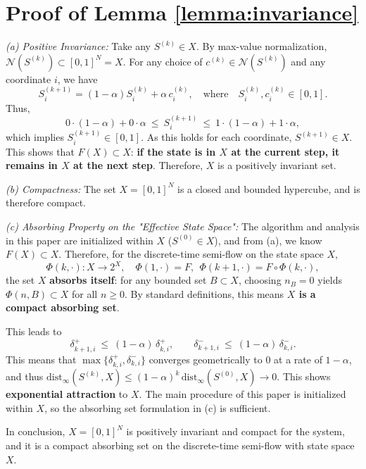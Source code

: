 \documentclass[journal]{IEEEtran}
\begin{document}
\appendices
\section{Proof of Lemma \ref{lemma:invariance}}
\label{app:proof_lemma_invariance}
\begin{IEEEproof}
\textit{(a) Positive Invariance:}
Take any $S^{(k)}\in X$. By max-value normalization, $\mathcal N(S^{(k)})\subset[0,1]^N=X$. For any choice of $c^{(k)}\in\mathcal N(S^{(k)})$ and any coordinate $i$, we have
\begin{equation}
S^{(k+1)}_i=(1-\alpha)S^{(k)}_i+\alpha\,c^{(k)}_i,
\quad\text{where}\quad S^{(k)}_i,c^{(k)}_i\in[0,1].
\end{equation}
Thus,
\begin{equation}
0\cdot(1-\alpha)+0\cdot\alpha\ \le\ S^{(k+1)}_i\ \le\ 1\cdot(1-\alpha)+1\cdot\alpha,
\end{equation}
which implies $S^{(k+1)}_i\in[0,1]$. As this holds for each coordinate, $S^{(k+1)}\in X$. This shows that $F(X)\subset X$: \textbf{if the state is in $X$ at the current step, it remains in $X$ at the next step}. Therefore, $X$ is a positively invariant set.

\textit{(b) Compactness:}
The set $X=[0,1]^N$ is a closed and bounded hypercube, and is therefore compact.

\textit{(c) Absorbing Property on the "Effective State Space":}
The algorithm and analysis in this paper are initialized within $X$ ($S^{(0)}\in X$), and from (a), we know $F(X)\subset X$. Therefore, for the discrete-time semi-flow on the state space $X$,
\begin{equation}
\Phi(k,\cdot):X\to 2^X,\quad \Phi(1,\cdot)=F,\ \ \Phi(k+1,\cdot)=F\circ\Phi(k,\cdot),
\end{equation}
the set $X$ \textbf{absorbs itself}: for any bounded set $B\subset X$, choosing $n_B=0$ yields $\Phi(n,B)\subset X$ for all $n\ge 0$. By standard definitions, this means \textbf{$X$ is a compact absorbing set}.



This leads to
\begin{equation}
\delta^+_{k+1,i}\ \le\ (1-\alpha)\,\delta^+_{k,i},\qquad 
\delta^-_{k+1,i}\ \le\ (1-\alpha)\,\delta^-_{k,i}.
\end{equation}
This means that $\max\{\delta^+_{k,i},\delta^-_{k,i}\}$ converges geometrically to 0 at a rate of $1-\alpha$, and thus $\mathrm{dist}_\infty(S^{(k)},X)\le (1-\alpha)^k\,\mathrm{dist}_\infty(S^{(0)},X)\to0$. This shows \textbf{exponential attraction} to $X$. The main procedure of this paper is initialized within $X$, so the absorbing set formulation in (c) is sufficient.

In conclusion, $X=[0,1]^N$ is positively invariant and compact for the system, and it is a compact absorbing set on the discrete-time semi-flow with state space $X$.
\end{IEEEproof}
\end{document}

